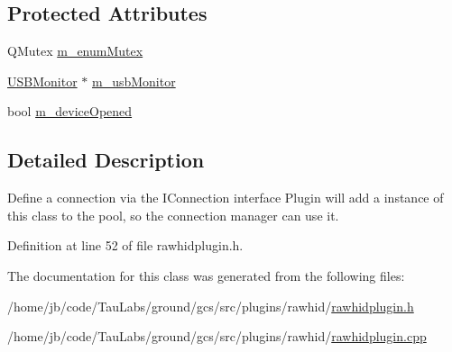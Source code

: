 \subsection*{\-Protected \-Attributes}
\begin{DoxyCompactItemize}
\item 
\-Q\-Mutex \hyperlink{group___raw_h_i_d_plugin_ga13d9bdfab2ab9e3a4f4cd08b53a2f105}{m\-\_\-enum\-Mutex}
\item 
\hyperlink{class_u_s_b_monitor}{\-U\-S\-B\-Monitor} $\ast$ \hyperlink{group___raw_h_i_d_plugin_ga03aaa7c95bd19c0d373b3c2b4e982cdb}{m\-\_\-usb\-Monitor}
\item 
bool \hyperlink{group___raw_h_i_d_plugin_ga043f346d34d71eb80f1e33ab78a82286}{m\-\_\-device\-Opened}
\end{DoxyCompactItemize}


\subsection{\-Detailed \-Description}
\-Define a connection via the \-I\-Connection interface \-Plugin will add a instance of this class to the pool, so the connection manager can use it. 

\-Definition at line 52 of file rawhidplugin.\-h.



\-The documentation for this class was generated from the following files\-:\begin{DoxyCompactItemize}
\item 
/home/jb/code/\-Tau\-Labs/ground/gcs/src/plugins/rawhid/\hyperlink{rawhidplugin_8h}{rawhidplugin.\-h}\item 
/home/jb/code/\-Tau\-Labs/ground/gcs/src/plugins/rawhid/\hyperlink{rawhidplugin_8cpp}{rawhidplugin.\-cpp}\end{DoxyCompactItemize}
